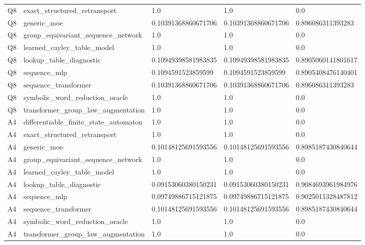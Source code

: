 \begin{table}[t]
\begin{tabular}{lllll}
Q8 & exact\_structured\_retransport & 1.0 & 1.0 & 0.0 \\
Q8 & generic\_moe & 0.10391368860671706 & 0.10391368860671706 & 0.896086311393283 \\
Q8 & group\_equivariant\_sequence\_network & 1.0 & 1.0 & 0.0 \\
Q8 & learned\_cayley\_table\_model & 1.0 & 1.0 & 0.0 \\
Q8 & lookup\_table\_diagnostic & 0.10949398581983835 & 0.10949398581983835 & 0.8905060141801617 \\
Q8 & sequence\_mlp & 0.1094591523859599 & 0.1094591523859599 & 0.8905408476140401 \\
Q8 & sequence\_transformer & 0.10391368860671706 & 0.10391368860671706 & 0.896086311393283 \\
Q8 & symbolic\_word\_reduction\_oracle & 1.0 & 1.0 & 0.0 \\
Q8 & transformer\_group\_law\_augmentation & 1.0 & 1.0 & 0.0 \\
A4 & differentiable\_finite\_state\_automaton & 1.0 & 1.0 & 0.0 \\
A4 & exact\_structured\_retransport & 1.0 & 1.0 & 0.0 \\
A4 & generic\_moe & 0.10148125691593556 & 0.10148125691593556 & 0.8985187430840644 \\
A4 & group\_equivariant\_sequence\_network & 1.0 & 1.0 & 0.0 \\
A4 & learned\_cayley\_table\_model & 1.0 & 1.0 & 0.0 \\
A4 & lookup\_table\_diagnostic & 0.09153060380150231 & 0.09153060380150231 & 0.9084693961984976 \\
A4 & sequence\_mlp & 0.09749886715121875 & 0.09749886715121875 & 0.9025011328487812 \\
A4 & sequence\_transformer & 0.10148125691593556 & 0.10148125691593556 & 0.8985187430840644 \\
A4 & symbolic\_word\_reduction\_oracle & 1.0 & 1.0 & 0.0 \\
A4 & transformer\_group\_law\_augmentation & 1.0 & 1.0 & 0.0 \\
\bottomrule
\end{tabular}
\end{table}
